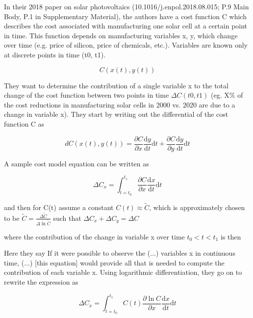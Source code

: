 \documentclass{article}
\begin{document}
In their 2018 paper on solar photovoltaics (10.1016/j.enpol.2018.08.015; P.9 Main Body,
P.1 in Supplementary Material), the authors have a cost function C which describes
the cost associated with manufacturing one solar cell at a certain point in time. This
function depends on manufacturing variables x, y, which change over time (e.g. price
of silicon, price of chemicals, etc.). Variables are known only at discrete points in time
(t0, t1).

\begin{equation}
    C(x(t),y(t))
\end{equation}

They want to determine the contribution of a single variable x to the total change of
the cost function between two points in time $\Delta C(t0, t1)$ (eg. X\% of the cost reductions
in manufacturing solar cells in 2000 vs. 2020 are due to a change in variable x).
They start by writing out the differential of the cost function C as

\begin{equation}
    dC(x(t),y(t)) = \frac{\partial C}{\partial x} \frac{\text{d}y}{\text{d}t} \text{d}t + \frac{\partial C}{\partial y} \frac{\text{d}y}{\text{d}t} \text{d}t
\end{equation}

A sample cost model equation can be written as

\begin{equation}
    \Delta C_x = \int_{t=t_0}^{t_1} \frac{\partial C}{\partial x} \frac{\text{d}x}{\text{d}t} \text{d}t
\end{equation}

and then for C(t) assume a constant $C(t) \approx \tilde{C}$, which is approximately chosen to be $\tilde{C}=\frac{\Delta \tilde{C}}{\Delta \ln \tilde{C}}$ such that $\Delta C_x+\Delta C_y=\Delta C$

where the contribution of the change in variable x over time $t_0 < t < t_1$ is then

Here they say
If it were possible to observe the (...) variables x in continuous time, (...) [this equation]
would provide all that is needed to compute the contribution of each variable x.
Using logarithmic differentiation, they go on to rewrite the expression as

\begin{equation}
    \Delta C_x = \int_{t=t_0}^{t_1} C(t) \frac{\partial \ln C}{\partial x} \frac{\text{d}x}{\text{d}t} \text{d}t
\end{equation}
\end{document}
